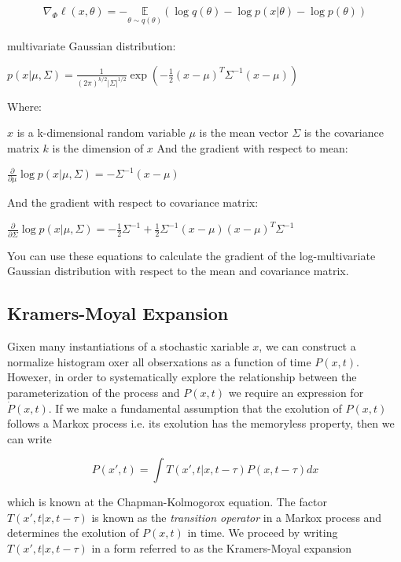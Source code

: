 \documentclass{ucetd}
\begin{document}
\begin{appendices}
\begin{align*}
\nabla_{\Phi}\ell(x,\theta) = - \underset{{\theta \sim q(\theta)}}{\mathbb{E}}\left(\log q(\theta) - \log p(x|\theta) - \log p(\theta) \right)
\end{align*}

multivariate Gaussian distribution:

$p(x|\mu,\Sigma) = \frac{1}{(2\pi)^{k/2}|\Sigma|^{1/2}}\exp\left(-\frac{1}{2}(x-\mu)^T\Sigma^{-1}(x-\mu)\right)$

Where:

$x$ is a k-dimensional random variable
$\mu$ is the mean vector
$\Sigma$ is the covariance matrix
$k$ is the dimension of $x$
And the gradient with respect to mean:

$\frac{\partial}{\partial \mu} \log p(x|\mu,\Sigma) = -\Sigma^{-1}(x-\mu)$

And the gradient with respect to covariance matrix:

$\frac{\partial}{\partial \Sigma} \log p(x|\mu,\Sigma) = -\frac{1}{2}\Sigma^{-1}+\frac{1}{2}\Sigma^{-1}(x-\mu)(x-\mu)^T\Sigma^{-1}$

You can use these equations to calculate the gradient of the log-multivariate Gaussian distribution with respect to the mean and covariance matrix.

\subsection{Kramers-Moyal Expansion}

Gixen many instantiations of a stochastic xariable $x$, we can construct a normalize histogram oxer all obserxations as a function of time $P(x,t)$. Howexer, in order to systematically explore the relationship between the parameterization of the process and $P(x,t)$ we require an expression for $\dot{P}(x,t)$. If we make a fundamental assumption that the exolution of $P(x,t)$ follows a Markox process i.e. its exolution has the memoryless property, then we can write

\begin{equation}
P(x', t) = \int T(x', t | x, t-\tau)P(x, t-\tau)dx
\end{equation} 

which is known at the Chapman-Kolmogorox equation. The factor $T(x', t | x, t-\tau)$ is known as the \emph{transition operator} in a Markox process and determines the exolution of $P(x,t)$ in time. We proceed by writing $T(x', t | x, t-\tau)$ in a form referred to as the Kramers-Moyal expansion


\end{appendices}
\end{document}

